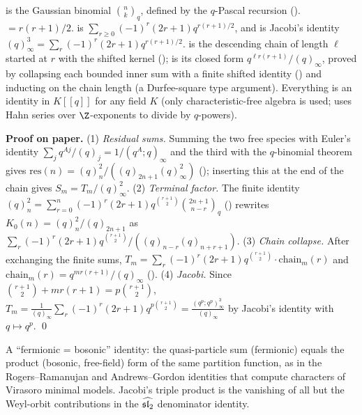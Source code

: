 \begin{dictionary}
 is the Gaussian binomial $\binom nk_q$, defined by the $q$-Pascal recursion
().  $=r(r+1)/2$.  is
$\sum_{r\ge0}(-1)^r(2r+1)q^{r(r+1)/2}$, and  is Jacobi's identity
$(q)_\infty^3=\sum_r(-1)^r(2r+1)q^{r(r+1)/2}$.  is the descending chain of length $\ell$
started at $r$ with the shifted kernel ();  is its closed form
$q^{\ell r(r+1)}/(q)_\infty$, proved by collapsing each bounded inner sum with a finite shifted identity
() and inducting on the chain length (a Durfee-square type argument). Everything is an identity in $K[[q]]$ for any field $K$ (only
characteristic-free algebra is used;  uses Hahn series over $\Z$-exponents to divide by
$q$-powers).
\end{dictionary}

\textbf{Proof on paper.} (1) \emph{Residual sums.} Summing the two free species with Euler's identity
$\sum_jq^{Aj}/(q)_j=1/(q^A;q)_\infty$ and the third with the $q$-binomial theorem gives
$\mathrm{res}(n)=(q)_n^2/((q)_{2n+1}(q)^2_\infty)$ (); inserting this at the end of the chain gives
$S_m=T_m/(q)^2_\infty$. (2) \emph{Terminal factor.} The finite identity
$(q)_n^2=\sum_{r=0}^n(-1)^r(2r+1)q^{\binom{r+1}2}\binom{2n+1}{n-r}_q$ () rewrites
$K_0(n)=(q)^2_n/(q)_{2n+1}$ as $\sum_r(-1)^r(2r+1)q^{\binom{r+1}2}/((q)_{n-r}(q)_{n+r+1})$. (3) \emph{Chain collapse.}
After exchanging the finite sums, $T_m=\sum_r(-1)^r(2r+1)q^{\binom{r+1}2}\cdot\mathrm{chain}_m(r)$ and
$\mathrm{chain}_m(r)=q^{mr(r+1)}/(q)_\infty$ (). (4) \emph{Jacobi.} Since
$\binom{r+1}2+mr(r+1)=p\binom{r+1}2$, $T_m=\frac1{(q)_\infty}\sum_r(-1)^r(2r+1)q^{p\binom{r+1}2}
=\frac{(q^p;q^p)^3_\infty}{(q)_\infty}$ by Jacobi's identity with $q\mapsto q^p$. \qed

\begin{physics}
A ``fermionic = bosonic'' identity: the quasi-particle sum (fermionic) equals the product (bosonic,
free-field) form of the same partition function, as in the Rogers--Ramanujan and Andrews--Gordon identities that
compute characters of Virasoro minimal models. Jacobi's triple product is the vanishing of all but the
Weyl-orbit contributions in the $\widehat{\mathfrak{sl}_2}$ denominator identity.
\end{physics}


